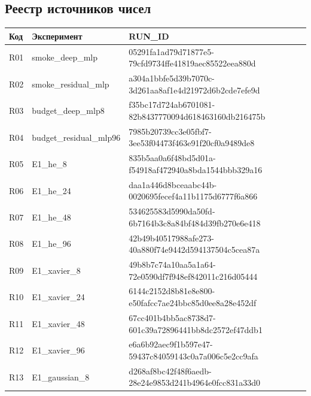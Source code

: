 \documentclass[10pt,a4paper]{article}
\begin{document}
\subsection*{Реестр источников чисел}

{\scriptsize\begin{longtable}{p{7mm}p{43mm}p{103mm}}\toprule Код & Эксперимент & RUN\_ID\\\midrule\endhead

R01 & smoke\_deep\_mlp & {\ttfamily 05291fa1ad79d71877e5-79cfd9734ffe41819aec85522eea880d} \\

R02 & smoke\_residual\_mlp & {\ttfamily a304a1bbfe5d39b7070c-3d261aa8af1e4d21972d6b2cde7efe9d} \\

R03 & budget\_deep\_mlp8 & {\ttfamily f35bc17d724ab6701081-82b8437770094d618463160db216475b} \\

R04 & budget\_residual\_mlp96 & {\ttfamily 7985b20739cc3e05fbf7-3ee53f04473f463e91f20cf0a9489de8} \\

R05 & E1\_he\_8 & {\ttfamily 835b5aa0a6f48bd5d01a-f54918af472940a8bda1544bbb329a16} \\

R06 & E1\_he\_24 & {\ttfamily daa1a446d8bceaabc44b-0020695fecef4a11b1175d6777f6a866} \\

R07 & E1\_he\_48 & {\ttfamily 534625583d5990da50fd-6b7164b3c8a84bf484d39fb270e6e418} \\

R08 & E1\_he\_96 & {\ttfamily 42b49b40517988afe273-40a880f74e9442d594137504c5cea87a} \\

R09 & E1\_xavier\_8 & {\ttfamily 49b8b7c74a10aa5a1a64-72e0590df7f948ef842011c216d05444} \\

R10 & E1\_xavier\_24 & {\ttfamily 6144c2152d8b81e8e800-e50fafcc7ae24bbc85d0ee8a28e452df} \\

R11 & E1\_xavier\_48 & {\ttfamily 67cc401b4bb5ac8738d7-601c39a72896441bb8dc2572ef47ddb1} \\

R12 & E1\_xavier\_96 & {\ttfamily e6a6b92aec9f1b597e47-59437c84059143c0a7a006c5e2cc9afa} \\

R13 & E1\_gaussian\_8 & {\ttfamily d268af8bc42f48f6aedb-28e24e9853d241b4964e0fcc831a33d0} \\


\end{longtable}}
\end{document}
